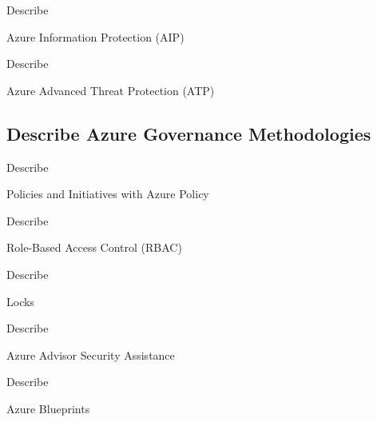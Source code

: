\documentclass{scrartcl}
\newenvironment{flashcard}[2][]{%
    #1
    \vfill
    \centerline{\Large{#2}}
    \vfill
    \newpage
}
{\newpage}
\newcommand{\subsectioncard}[1]{
    \vspace*{\stretch{1}}
    \subsection{#1}
    \vspace*{\stretch{1}}
    \pagebreak
}
\begin{document}
    \begin{flashcard}[Describe]{Azure Information Protection (AIP)}

    \end{flashcard}

    \begin{flashcard}[Describe]{Azure Advanced Threat Protection (ATP)}

    \end{flashcard}

    \subsectioncard{Describe Azure Governance Methodologies}

    \begin{flashcard}[Describe]{Policies and Initiatives with Azure Policy}

    \end{flashcard}

    \begin{flashcard}[Describe]{Role-Based Access Control (RBAC)}

    \end{flashcard}

    \begin{flashcard}[Describe]{Locks}

    \end{flashcard}

    \begin{flashcard}[Describe]{Azure Advisor Security Assistance}

    \end{flashcard}

    \begin{flashcard}[Describe]{Azure Blueprints}

    \end{flashcard}
\end{document}
